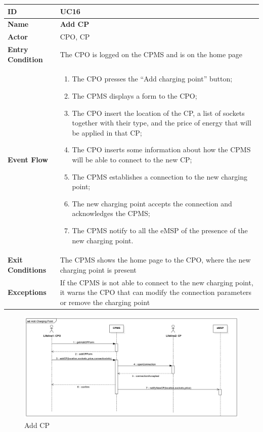 \documentclass{Configuration_Files/PoliMi3i_thesis}
\begin{document}

\begin{table}[H]
    \begin{xltabular}{\textwidth}{| >{}l | X |}
    \hline
    \textbf{ID} & \textbf{UC16}\T\B\\
    \hline
    \textbf{Name} & \textbf{Add CP}\T\B\\
    \hline \hline
    \textbf{Actor} & CPO, CP\T\B \\
    \hline
    \textbf{Entry Condition} & The CPO is logged on the CPMS and is on the home page\T\B\\
    \hline
    \textbf{Event Flow} & 
        \begin{enumerate}
        \item The CPO presses the “Add charging point” button;
        \item The CPMS displays a form to the CPO;
        \item The CPO insert the location of the CP, a list of sockets together with their type, and the price of energy that will be applied in that CP;
        \item The CPO inserts some information about how the CPMS will be able to connect to the new CP;
        \item The CPMS establishes a connection to the new charging point;
        \item The new charging point accepts the connection and acknowledges the CPMS;
        \item The CPMS notify to all the eMSP of the presence of the new charging point.
        \end{enumerate}\B\\
    \hline
    \textbf{Exit Conditions} & The CPMS shows the home page to the CPO, where the new charging point is present\B\\
    \hline
    \textbf{Exceptions} & If the CPMS is not able to connect to the new charging point, it warns the CPO that can modify the connection parameters or remove the charging point\B\\
    \hline
    \end{xltabular}
\end{table}

\begin{figure}[H]
    \centering
    \includegraphics[width=1\textwidth]{Images/UseCases/AddCP.jpg}
    \caption{Add CP}
\end{figure}
\end{document}
